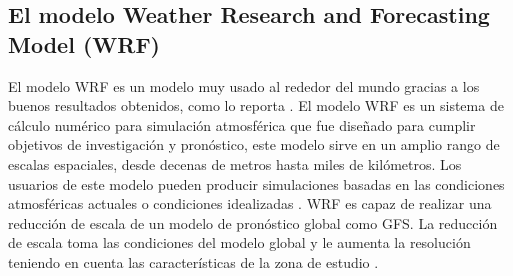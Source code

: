 %


\subsection{El modelo Weather Research and Forecasting Model (WRF)}

El modelo WRF es un modelo muy usado al rededor del mundo gracias a los buenos resultados obtenidos, como lo reporta \citet{Jimenez2014}. El modelo WRF es un sistema de cálculo numérico para simulación atmosférica que fue diseñado para cumplir objetivos de investigación y pronóstico, este modelo sirve en un amplio rango de escalas espaciales, desde decenas de metros hasta miles de kilómetros. Los usuarios de este modelo pueden producir simulaciones basadas en las condiciones atmosféricas actuales o condiciones idealizadas \citep{Pielke2002}. WRF es capaz de realizar una reducción de escala de un modelo de pronóstico global como GFS. La reducción de escala toma las condiciones del modelo global y le aumenta la resolución teniendo en cuenta las características de la zona de estudio \citep{Sene2010}.\\


